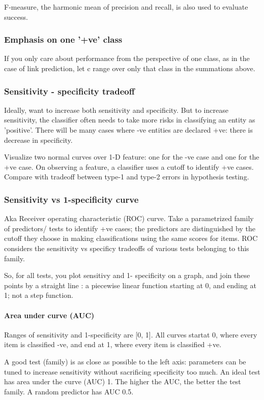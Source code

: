 \documentclass[oneside, article]{memoir}
\begin{document}
F-measure, the harmonic mean of precision and recall, is also used to evaluate success.

\subsubsection{Emphasis on one '+ve' class}
If you only care about performance from the perspective of one class, as in the case of link prediction, let c range over only that class in the summations above.

\subsubsection{Sensitivity - specificity tradeoff}
Ideally, want to increase both sensitivity and specificity. But to increase sensitivity, the classifier often needs to take more risks in classifying an entity as 'positive'. There will be many cases where -ve entities are declared +ve: there is decrease in specificity.

Visualize two normal curves over 1-D feature: one for the -ve case and one for the +ve case. On observing a feature, a classifier uses a cutoff to identify +ve cases. Compare with tradeoff between type-1 and type-2 errors in hypothesis testing.

\subsubsection{Sensitivity vs 1-specificity curve}
Aka Receiver operating characteristic (ROC) curve. Take a parametrized family of predictors/ tests to identify +ve cases; the predictors are distinguished by the cutoff they choose in making classifications using the same scores for items. ROC considers the sensitivity vs specificy tradeoffs of various tests belonging to this family.

So, for all tests, you plot sensitivy and 1- specificity on a graph, and join these points by a straight line : a piecewise linear function starting at 0, and ending at 1; not a step function.

\paragraph*{Area under curve (AUC)}
Ranges of sensitivity and 1-specificity are [0, 1]. All curves startat 0, where every item is classified -ve, and end at 1, where every item is classified +ve.

A good test (family) is as close as possible to the left axis: parameters can be tuned to increase sensitivity without sacrificing specificity too much. An ideal test has area under the curve (AUC) 1. The higher the AUC, the better the test family. A random predictor has AUC 0.5.
\end{document}
